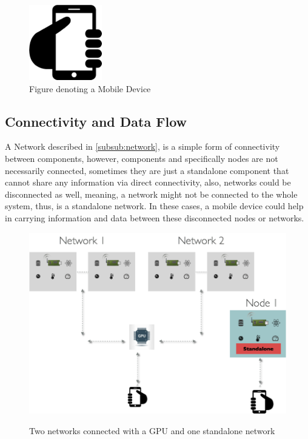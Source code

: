 \begin{figure}[H]
	\centering
	\includegraphics[scale=0.3]{images/mobile.png}
	\caption{Figure denoting a Mobile Device}
	\label{fig:mobile}
\end{figure}



\subsection{Connectivity and Data Flow}
A Network described in \ref{subsub:network}, is a simple form of connectivity between components, however, components and specifically nodes are not necessarily connected, sometimes they are just a standalone component that cannot share any information via direct connectivity, also, networks could be disconnected as well, meaning, a network might not be connected to the whole system, thus, is a standalone network. In these cases, a mobile device could help in carrying information and data between these disconnected nodes or networks. 

\begin{figure}[H]
	\centering
	\includegraphics[scale=0.5]{images/system.png}
	\label{fig:system}
	\caption{Two networks connected with a GPU and one standalone network}
\end{figure}







